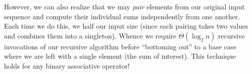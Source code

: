 \documentclass[12pt,letterpaper,twoside]{article}
\begin{document}
However, we can also realize that we may \emph{pair} elements from our original
input sequence and compute their individual sums independently from one another.
Each time we do this, we half our input size (since each pairing takes two 
values and combines them into a singleton). Whence we require $\Theta(\log_2 n)$
recursive invocations of our recursive algorithm before ``bottoming out''
to a base case where we are left with a single element (the sum of interest).
This technique holds for any binary associative operator!





 
\end{document}
